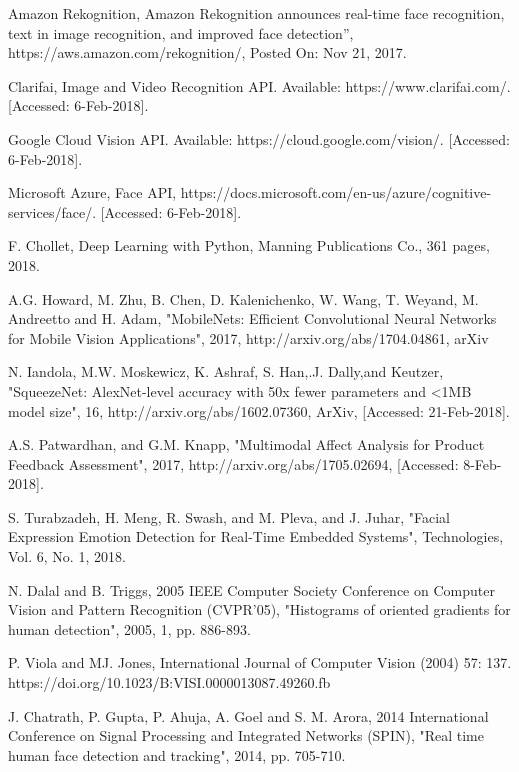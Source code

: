 \documentclass[conference]{IEEEtran}
\begin{document}
\begin{thebibliography}{00}

 Amazon Rekognition, Amazon Rekognition announces real-time face recognition, text in image recognition, and improved face detection”, https://aws.amazon.com/rekognition/, Posted On: Nov 21, 2017.

 Clarifai, Image and Video Recognition API. Available: https://www.clarifai.com/. [Accessed: 6-Feb-2018].

 Google Cloud Vision API. Available: https://cloud.google.com/vision/. [Accessed: 6-Feb-2018].

 Microsoft Azure, Face API, https://docs.microsoft.com/en-us/azure/cognitive-services/face/. [Accessed: 6-Feb-2018].

F. Chollet, Deep Learning with Python, Manning Publications Co., 361 pages, 2018.

A.G. Howard, M. Zhu, B. Chen, D. Kalenichenko, W. Wang, T. Weyand, M. Andreetto and H. Adam, "MobileNets: Efficient Convolutional Neural Networks for Mobile Vision Applications", 2017, http://arxiv.org/abs/1704.04861, arXiv

 N. Iandola,  M.W. Moskewicz, K. Ashraf, S. Han,.J. Dally,and Keutzer, "SqueezeNet: AlexNet-level accuracy with 50x fewer parameters and {\textless}1MB model size", 16, http://arxiv.org/abs/1602.07360, ArXiv, [Accessed: 21-Feb-2018].

A.S. Patwardhan, and G.M. Knapp, "Multimodal Affect Analysis for Product Feedback Assessment", 2017, http://arxiv.org/abs/1705.02694, [Accessed: 8-Feb-2018].

S. Turabzadeh, H. Meng, R. Swash, and M. Pleva, and J. Juhar, "Facial Expression Emotion Detection for Real-Time Embedded Systems", Technologies, Vol. 6, No. 1, 2018.

N. Dalal and B. Triggs, 2005 IEEE Computer Society Conference on Computer Vision and Pattern Recognition (CVPR'05), "Histograms of oriented gradients for human detection", 2005, 1, pp. 886-893.

P. Viola and MJ. Jones, International Journal of Computer Vision (2004) 57: 137. https://doi.org/10.1023/B:VISI.0000013087.49260.fb

J. Chatrath, P. Gupta, P. Ahuja, A. Goel and S. M. Arora, 2014 International Conference on Signal Processing and Integrated Networks (SPIN), "Real time human face detection and tracking", 2014, pp. 705-710.


\end{thebibliography}
\end{document}
